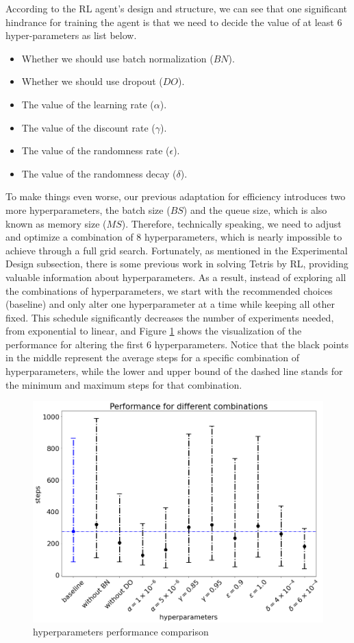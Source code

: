 \documentclass[letterpaper]{article} %
\begin{document}
\begin{itemize}
  According to the RL agent's design and structure, we can see that one significant hindrance for training the agent is that we need to decide the value of at least $6$ hyper-parameters as list below.
  \begin{itemize}
    \item 
    Whether we should use batch normalization ($BN$).
    \item 
    Whether we should use dropout ($DO$).
    \item 
    The value of the learning rate ($\alpha$).
    \item 
    The value of the discount rate ($\gamma$).
    \item 
    The value of the randomness rate ($\epsilon$).
    \item 
    The value of the randomness decay ($\delta$).
  \end{itemize}
  To make things even worse, our previous adaptation for efficiency introduces two more hyperparameters, the batch size ($BS$) and the queue size, which is also known as memory size ($MS$). Therefore, technically speaking, we need to adjust and optimize a combination of $8$ hyperparameters, which is nearly impossible to achieve through a full grid search. Fortunately, as mentioned in the Experimental Design subsection, there is some previous work in solving Tetris by RL, providing valuable information about hyperparameters. As a result, instead of exploring all the combinations of hyperparameters, we start with the recommended choices (baseline) and only alter one hyperparameter at a time while keeping all other fixed. This schedule significantly decreases the number of experiments needed, from exponential to linear, and Figure \ref{fig:hp1} shows the visualization of the performance for altering the first $6$ hyperparameters. Notice that the black points in the middle represent the average steps for a specific combination of hyperparameters, while the lower and upper bound of the dashed line stands for the minimum and maximum steps for that combination.

  \begin{figure}[h!]
    \centering
    \includegraphics[width=0.9\linewidth]{figures/HP1}
    \caption{hyperparameters performance comparison}
    \label{fig:hp1}
  \end{figure}


\end{itemize}
\end{document}
